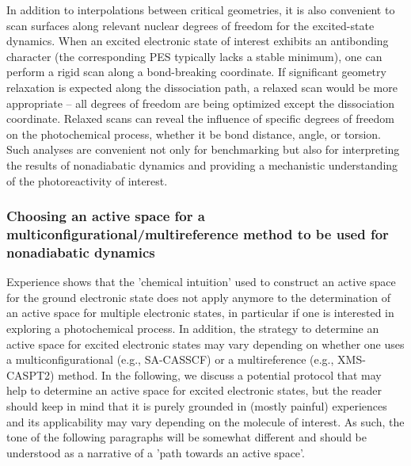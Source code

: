 \documentclass[9pt,bestpractices]{livecoms}
\begin{document}
In addition to interpolations between critical geometries, it is also convenient to scan surfaces along relevant nuclear degrees of freedom for the excited-state dynamics. When an excited electronic state of interest exhibits an antibonding character (the corresponding PES typically lacks a stable minimum), one can perform a rigid scan along a bond-breaking coordinate. If significant geometry relaxation is expected along the dissociation path, a relaxed scan would be more appropriate -- all degrees of freedom are being optimized except the dissociation coordinate. Relaxed scans can reveal the influence of specific degrees of freedom on the photochemical process, whether it be bond distance, angle, or torsion. Such analyses are convenient not only for benchmarking but also for interpreting the results of nonadiabatic dynamics and providing a mechanistic understanding of the photoreactivity of interest.

\subsubsection{Choosing an active space for a multiconfigurational/multireference method to be used for nonadiabatic dynamics}
\label{sec:activespace}

Experience shows that the 'chemical intuition' used to construct an active space for the ground electronic state does not apply anymore to the determination of an active space for multiple electronic states, in particular if one is interested in exploring a photochemical process. In addition, the strategy to determine an active space for excited electronic states may vary depending on whether one uses a multiconfigurational (e.g., SA-CASSCF) or a multireference (e.g., XMS-CASPT2) method. In the following, we discuss a potential protocol that may help to determine an active space for excited electronic states, but the reader should keep in mind that it is purely grounded in (mostly painful) experiences and its applicability may vary depending on the molecule of interest. As such, the tone of the following paragraphs will be somewhat different and should be understood as a narrative of a 'path towards an active space'.
\end{document}
